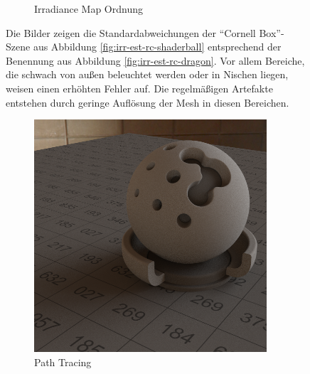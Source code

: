 \begin{figure}[h]
\begin{subfigure}[b]{0.5\textwidth}
			\caption{Irradiance Map Ordnung}
		\end{subfigure}
		\caption[Irradiance-Map anhand der \enquote{Cornell Box}-Szene]{Die Bilder zeigen die Standardabweichungen der \enquote{Cornell Box}-Szene aus Abbildung \ref{fig:irr-est-rc-shaderball} entsprechend der Benennung aus Abbildung \ref{fig:irr-est-rc-dragon}. Vor allem Bereiche, die schwach von außen beleuchtet werden oder in Nischen liegen, weisen einen erhöhten Fehler auf. Die regelmäßigen Artefakte entstehen durch geringe Auflösung der Mesh in diesen Bereichen.}
		\label{fig:irr-map-cornell}
	\end{figure}

	\begin{figure}[h]
		\begin{subfigure}[t]{0.245\textwidth}
			\center
			\includegraphics[width=0.95\textwidth]{pic/irrmap-shaderball_e-ref.png}
			\caption{Path Tracing}
		\end{subfigure}
		\begin{subfigure}[t]{0.245\textwidth}
			\center

\end{subfigure}
\end{figure}
